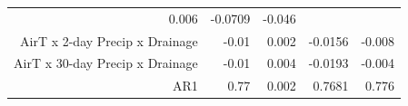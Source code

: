 \documentclass[]{article}
\begin{document}
\begin{longtable}[c]{@{}rrrrr@{}}
\begin{minipage}[t]{0.07\columnwidth}\raggedleft\strut
0.006
\strut\end{minipage} &
\begin{minipage}[t]{0.10\columnwidth}\raggedleft\strut
-0.0709
\strut\end{minipage} &
\begin{minipage}[t]{0.10\columnwidth}\raggedleft\strut
-0.046
\strut\end{minipage}\tabularnewline
\begin{minipage}[t]{0.37\columnwidth}\raggedleft\strut
AirT x 2-day Precip x Drainage
\strut\end{minipage} &
\begin{minipage}[t]{0.08\columnwidth}\raggedleft\strut
-0.01
\strut\end{minipage} &
\begin{minipage}[t]{0.07\columnwidth}\raggedleft\strut
0.002
\strut\end{minipage} &
\begin{minipage}[t]{0.10\columnwidth}\raggedleft\strut
-0.0156
\strut\end{minipage} &
\begin{minipage}[t]{0.10\columnwidth}\raggedleft\strut
-0.008
\strut\end{minipage}\tabularnewline
\begin{minipage}[t]{0.37\columnwidth}\raggedleft\strut
AirT x 30-day Precip x Drainage
\strut\end{minipage} &
\begin{minipage}[t]{0.08\columnwidth}\raggedleft\strut
-0.01
\strut\end{minipage} &
\begin{minipage}[t]{0.07\columnwidth}\raggedleft\strut
0.004
\strut\end{minipage} &
\begin{minipage}[t]{0.10\columnwidth}\raggedleft\strut
-0.0193
\strut\end{minipage} &
\begin{minipage}[t]{0.10\columnwidth}\raggedleft\strut
-0.004
\strut\end{minipage}\tabularnewline
\begin{minipage}[t]{0.37\columnwidth}\raggedleft\strut
AR1
\strut\end{minipage} &
\begin{minipage}[t]{0.08\columnwidth}\raggedleft\strut
0.77
\strut\end{minipage} &
\begin{minipage}[t]{0.07\columnwidth}\raggedleft\strut
0.002
\strut\end{minipage} &
\begin{minipage}[t]{0.10\columnwidth}\raggedleft\strut
0.7681
\strut\end{minipage} &
\begin{minipage}[t]{0.10\columnwidth}\raggedleft\strut
0.776
\strut\end{minipage}\tabularnewline
\bottomrule
\end{longtable}
\end{document}
